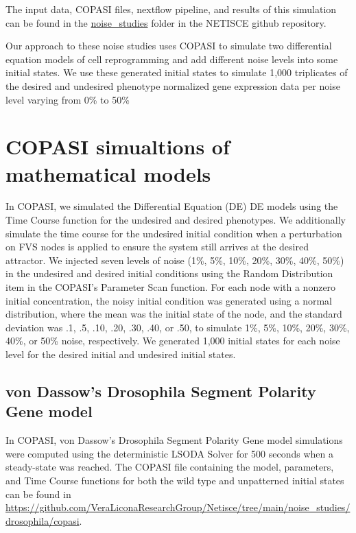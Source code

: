 \documentclass[
]{book}
\begin{document}
The input data, COPASI files, nextflow pipeline, and results of this simulation can be found in the \href{https://github.com/VeraLiconaResearchGroup/Netisce/tree/main/noise_studies}{noise\_studies} folder in the NETISCE github repository.

Our approach to these noise studies uses COPASI to simulate two differential equation models of cell reprogramming and add different noise levels into some initial states. We use these generated initial states to simulate 1,000 triplicates of the desired and undesired phenotype normalized gene expression data per noise level varying from 0\% to 50\%

\hypertarget{copasi-simualtions-of-mathematical-models}{%
\section{COPASI simualtions of mathematical models}\label{copasi-simualtions-of-mathematical-models}}

In COPASI, we simulated the Differential Equation (DE) DE models using the Time Course function for the undesired and desired phenotypes. We additionally simulate the time course for the undesired initial condition when a perturbation on FVS nodes is applied to ensure the system still arrives at the desired attractor. We injected seven levels of noise (1\%, 5\%, 10\%, 20\%, 30\%, 40\%, 50\%) in the undesired and desired initial conditions using the Random Distribution item in the COPASI's Parameter Scan function. For each node with a nonzero initial concentration, the noisy initial condition was generated using a normal distribution, where the mean was the initial state of the node, and the standard deviation was .1, .5, .10, .20, .30, .40, or .50, to simulate 1\%, 5\%, 10\%, 20\%, 30\%, 40\%, or 50\% noise, respectively. We generated 1,000 initial states for each noise level for the desired initial and undesired initial states.

\hypertarget{von-dassows-drosophila-segment-polarity-gene-model}{%
\subsection{von Dassow's Drosophila Segment Polarity Gene model}\label{von-dassows-drosophila-segment-polarity-gene-model}}

In COPASI, von Dassow's Drosophila Segment Polarity Gene model simulations were computed using the deterministic LSODA Solver for 500 seconds when a steady-state was reached. The COPASI file containing the model, parameters, and Time Course functions for both the wild type and unpatterned initial states can be found in \url{https://github.com/VeraLiconaResearchGroup/Netisce/tree/main/noise_studies/drosophila/copasi}.
\end{document}
